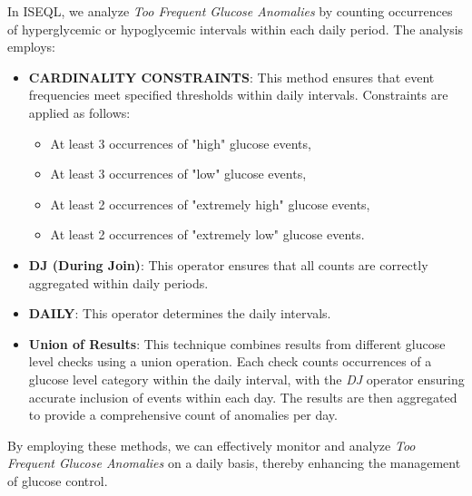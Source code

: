 \documentclass{article}
\begin{document}
In ISEQL, we analyze \textit{Too Frequent Glucose Anomalies} by counting occurrences of hyperglycemic or hypoglycemic intervals within each daily period. The analysis employs:

\begin{itemize}
    \item \textbf{CARDINALITY CONSTRAINTS}: This method ensures that event frequencies meet specified thresholds within daily intervals. Constraints are applied as follows:
    \begin{itemize}
        \item At least 3 occurrences of "high" glucose events,
        \item At least 3 occurrences of "low" glucose events,
        \item At least 2 occurrences of "extremely high" glucose events,
        \item At least 2 occurrences of "extremely low" glucose events.
    \end{itemize}
    
    \item \textbf{DJ (During Join)}: This operator ensures that all counts are correctly aggregated within daily periods.
    
    \item \textbf{DAILY}: This operator determines the daily intervals.
    
    \item \textbf{Union of Results}: This technique combines results from different glucose level checks using a union operation. Each check counts occurrences of a glucose level category within the daily interval, with the \textit{DJ} operator ensuring accurate inclusion of events within each day. The results are then aggregated to provide a comprehensive count of anomalies per day.
\end{itemize}

By employing these methods, we can effectively monitor and analyze \textit{Too Frequent Glucose Anomalies} on a daily basis, thereby enhancing the management of glucose control.
\end{document}
